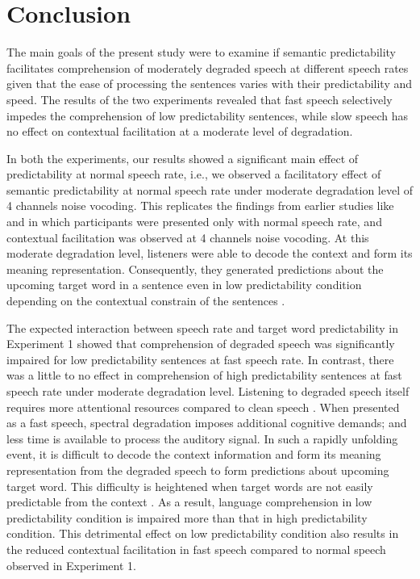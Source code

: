 \documentclass[a4paper, nobind]{templates/ociamthesis}
\begin{document}
\hypertarget{conclusion-2}{%
\section{Conclusion}\label{conclusion-2}}

The main goals of the present study were to examine if semantic predictability facilitates comprehension of moderately degraded speech at different speech rates given that the ease of processing the sentences varies with their predictability and speed.
The results of the two experiments revealed that fast speech selectively impedes the comprehension of low predictability sentences, while slow speech has no effect on contextual facilitation at a moderate level of degradation.

In both the experiments, our results showed a significant main effect of predictability at normal speech rate,
i.e., we observed a facilitatory effect of semantic predictability at normal speech rate under moderate degradation level of 4 channels noise vocoding.
This replicates the findings from earlier studies like \textcite{Obleser2010} and \textcite{Bhandari2021} in which participants were presented only with normal speech rate, and contextual facilitation was observed at 4 channels noise vocoding.
At this moderate degradation level, listeners were able to decode the context and form its meaning representation.
Consequently, they generated predictions about the upcoming target word in a sentence even in low predictability condition depending on the contextual constrain of the sentences \autocites{Bhandari2021}[see also,][]{Strauss2013}.

The expected interaction between speech rate and target word predictability in Experiment 1 showed that comprehension of degraded speech was significantly impaired for low predictability sentences at fast speech rate. In contrast, there was a little to no effect in comprehension of high predictability sentences at fast speech rate under moderate degradation level.
Listening to degraded speech itself requires more attentional resources compared to clean speech \autocite{Wild2012}.
When presented as a fast speech, spectral degradation imposes additional cognitive demands; and less time is available to process the auditory signal.
In such a rapidly unfolding event, it is difficult to decode the context information and form its meaning representation from the degraded speech to form predictions about upcoming target word.
This difficulty is heightened when target words are not easily predictable from the context \autocite{Aydelott2004}.
As a result, language comprehension in low predictability condition is impaired more than that in high predictability condition.
This detrimental effect on low predictability condition also results in the reduced contextual facilitation in fast speech compared to normal speech observed in Experiment 1.
\end{document}
